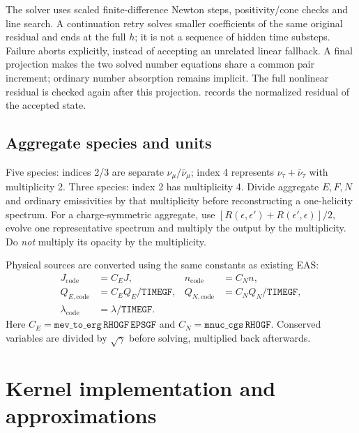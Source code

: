 \documentclass[11pt,a4paper]{article}
\newcommand{\code}[1]{\texttt{#1}}
\begin{document}
The solver uses scaled finite-difference Newton steps, positivity/cone checks
and line search. A continuation retry solves smaller coefficients of the same
original residual and ends at the full $h$; it is not a sequence of hidden
time substeps. Failure aborts explicitly, instead of accepting an unrelated
linear fallback. A final projection makes the two solved number equations
share a common pair increment; ordinary number absorption remains implicit.
The full nonlinear residual is checked again after this projection.
 records the normalized residual of the accepted state.

\subsection{Aggregate species and units}

Five species: indices 2/3 are separate $\nu_\mu/\bar\nu_\mu$; index 4
represents $\nu_\tau+\bar\nu_\tau$ with multiplicity 2. Three species: index 2
has multiplicity 4. Divide aggregate $E,F,N$ and ordinary emissivities by that
multiplicity before reconstructing a one-helicity spectrum. For a
charge-symmetric aggregate, use $[R(\epsilon,\epsilon')+
R(\epsilon',\epsilon)]/2$, evolve one representative spectrum and multiply
the output by the multiplicity. Do \emph{not} multiply its opacity by the
multiplicity.

Physical sources are converted using the same constants as existing EAS:
\[
 \begin{aligned}
 J_{\mathrm{code}}&=C_EJ,& n_{\mathrm{code}}&=C_Nn,\\
 Q_{E,\mathrm{code}}&=C_EQ_E/\code{TIMEGF},&
 Q_{N,\mathrm{code}}&=C_NQ_N/\code{TIMEGF},\\
 \lambda_{\mathrm{code}}&=\lambda/\code{TIMEGF}.&&
 \end{aligned}
\]
Here $C_E=\code{mev\_to\_erg}\,\code{RHOGF}\,\code{EPSGF}$ and
$C_N=\code{mnuc\_cgs}\,\code{RHOGF}$. Conserved variables are divided by
$\sqrt{\gamma}$ before solving, multiplied back afterwards.

\section{Kernel implementation and approximations}
\end{document}
